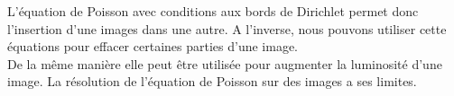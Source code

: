 L'équation de Poisson avec conditions aux bords de Dirichlet permet donc l'insertion d'une images dans une autre. A l'inverse, nous pouvons utiliser cette équations pour effacer certaines parties d'une image. \\ 
De la même manière elle peut être utilisée pour augmenter la luminosité d'une image.
La résolution de l'équation de Poisson sur des images a ses limites.
\cite{Image}
\cite{Douglas}
\cite{Gradient}
\cite{Opti}
\cite{Fourier}